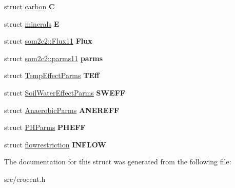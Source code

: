 \begin{DoxyCompactItemize}
\item 
\hypertarget{structsom2c2_adfb5023c2ac947e249fc44fa264ede86}{struct \hyperlink{structcarbon}{carbon} {\bfseries C}}\label{structsom2c2_adfb5023c2ac947e249fc44fa264ede86}

\item 
\hypertarget{structsom2c2_a877a58f566e2ffb0f9f0d4fe5ccabe72}{struct \hyperlink{structminerals}{minerals} {\bfseries E}}\label{structsom2c2_a877a58f566e2ffb0f9f0d4fe5ccabe72}

\item 
\hypertarget{structsom2c2_ad443ea2d925b694e27d6641d48057263}{struct \hyperlink{structsom2c2_1_1_flux11}{som2c2\-::\-Flux11} {\bfseries Flux}}\label{structsom2c2_ad443ea2d925b694e27d6641d48057263}

\item 
\hypertarget{structsom2c2_a7603cec2168c5d7491ef7f4e603bd525}{struct \hyperlink{structsom2c2_1_1parms11}{som2c2\-::parms11} {\bfseries parms}}\label{structsom2c2_a7603cec2168c5d7491ef7f4e603bd525}

\item 
\hypertarget{structsom2c2_a16a051bad5e590f910ae27d2a13ae1b3}{struct \hyperlink{struct_temp_effect_parms}{Temp\-Effect\-Parms} {\bfseries T\-Eff}}\label{structsom2c2_a16a051bad5e590f910ae27d2a13ae1b3}

\item 
\hypertarget{structsom2c2_aef132ab3d382384c2afa9061900d55f6}{struct \hyperlink{struct_soil_water_effect_parms}{Soil\-Water\-Effect\-Parms} {\bfseries S\-W\-E\-F\-F}}\label{structsom2c2_aef132ab3d382384c2afa9061900d55f6}

\item 
\hypertarget{structsom2c2_a91d5096938406cfb2a12a51142962733}{struct \hyperlink{struct_anaerobic_parms}{Anaerobic\-Parms} {\bfseries A\-N\-E\-R\-E\-F\-F}}\label{structsom2c2_a91d5096938406cfb2a12a51142962733}

\item 
\hypertarget{structsom2c2_a2f53bd98f6f53ec032e60d229123aa85}{struct \hyperlink{struct_p_h_parms}{P\-H\-Parms} {\bfseries P\-H\-E\-F\-F}}\label{structsom2c2_a2f53bd98f6f53ec032e60d229123aa85}

\item 
\hypertarget{structsom2c2_a7e6573afc6996c29022f26ae4e2e19b4}{struct \hyperlink{structflowrestriction}{flowrestriction} {\bfseries I\-N\-F\-L\-O\-W}}\label{structsom2c2_a7e6573afc6996c29022f26ae4e2e19b4}

\end{DoxyCompactItemize}


The documentation for this struct was generated from the following file\-:\begin{DoxyCompactItemize}
\item 
src/crocent.\-h\end{DoxyCompactItemize}

